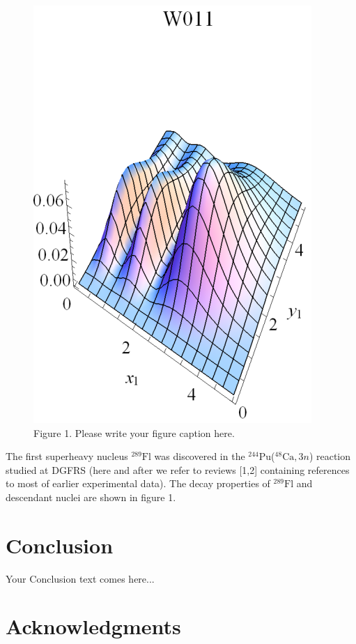 \documentclass[12pt,a4paper,twoside]{article}
\begin{document}
\begin{figure}[h!]
\centering
\includegraphics[scale=0.8]{W1_1.eps}\\
\scriptsize{ Figure 1. Please write your figure caption here.}
\label{fig:image1}
\end{figure}

The first superheavy nucleus $^{289}\text{Fl}$ was discovered in the $^{244}$Pu($^{48}\text{Ca},3n$) reaction studied at DGFRS (here and after we refer to reviews [1,2] containing references to most of earlier experimental data). The decay properties of $^{289}\text{Fl}$ and descendant nuclei are shown in figure 1.


\section*{Conclusion}

Your Conclusion text comes here...

\section*{Acknowledgments }
\end{document}
